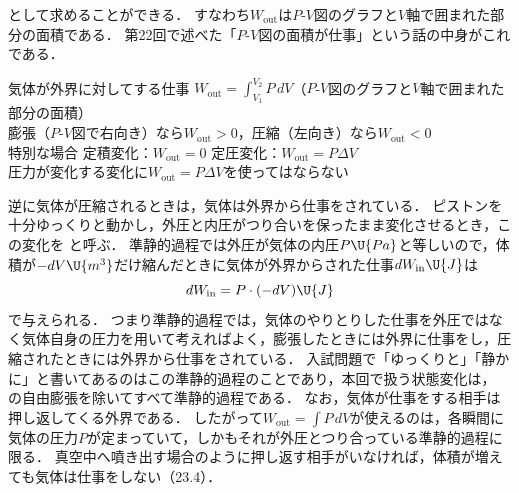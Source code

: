 \noindent として求めることができる．
すなわち{\gtfamily $W_{\mathrm{out}}$は$P$-$V$図のグラフと$V$軸で囲まれた部分の面積}である．
第22回で述べた「$P$-$V$図の面積が仕事」という話の中身がこれである．

\begin{matome}{気体が外界に対してする仕事}
 \hspace{3mm} $W_{\mathrm{out}}=\displaystyle\int_{V_1}^{V_2}P\,dV$\hspace{4mm}（$P$-$V$図のグラフと$V$軸で囲まれた部分の面積）\\[1mm]
 \hspace{8mm} 膨張（$P$-$V$図で右向き）なら$W_{\mathrm{out}}>0$，圧縮（左向き）なら$W_{\mathrm{out}}<0$\\[1mm]
 \hspace{3mm} 特別な場合\hspace{4mm} 定積変化：$W_{\mathrm{out}}=0$\hspace{8mm} 定圧変化：$W_{\mathrm{out}}=P\Delta V$\\[0.5mm]
 \hspace{8mm} {\gtfamily 圧力が変化する変化に$W_{\mathrm{out}}=P\Delta V$を使ってはならない}
\end{matome}

逆に気体が圧縮されるときは，気体は外界から仕事をされている．
ピストンを十分ゆっくりと動かし，外圧と内圧がつり合いを保ったまま変化させるとき，この変化を\,\,と呼ぶ．
準静的過程では外圧が気体の内圧$P\U{Pa}$と等しいので，体積が$-dV\U{m^3}$だけ縮んだときに気体が外界からされた仕事$dW_{\mathrm{in}}\U{J}$は
\[dW_{\mathrm{in}}=P\cdot(-dV)\U{J}\]
で与えられる．
つまり準静的過程では，気体のやりとりした仕事を{\gtfamily 外圧ではなく気体自身の圧力}を用いて考えればよく，膨張したときには外界に仕事をし，圧縮されたときには外界から仕事をされている．
入試問題で「ゆっくりと」「静かに」と書いてあるのはこの準静的過程のことであり，本回で扱う状態変化は，{ の自由膨張を除いてすべて準静的過程}である．
なお，気体が仕事をする相手は{\gtfamily 押し返してくる外界}である．
したがって$W_{\mathrm{out}}=\displaystyle\int P\,dV$が使えるのは，各瞬間に気体の圧力$P$が定まっていて，しかもそれが外圧とつり合っている準静的過程に限る．
真空中へ噴き出す場合のように押し返す相手がいなければ，{\gtfamily 体積が増えても気体は仕事をしない}（23.4）．

